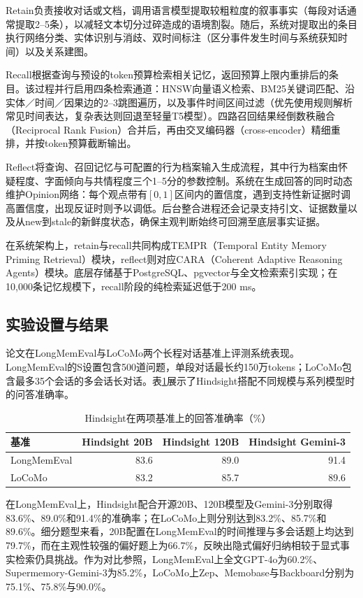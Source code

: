 Retain负责接收对话或文档，调用语言模型提取较粗粒度的叙事事实（每段对话通常提取2--5条），以减轻文本切分过碎造成的语境割裂。随后，系统对提取出的条目执行网络分类、实体识别与消歧、双时间标注（区分事件发生时间与系统获知时间）以及关系建图。

Recall根据查询与预设的token预算检索相关记忆，返回预算上限内重排后的条目。该过程并行启用四条检索通道：HNSW向量语义检索、BM25关键词匹配、沿实体／时间／因果边的2--3跳图遍历，以及事件时间区间过滤（优先使用规则解析常见时间表达，复杂表达则回退至轻量T5模型）。四路召回结果经倒数秩融合（Reciprocal Rank Fusion）合并后，再由交叉编码器（cross-encoder）精细重排，并按token预算截断输出。

Reflect将查询、召回记忆与可配置的行为档案输入生成流程，其中行为档案由怀疑程度、字面倾向与共情程度三个1--5分的参数控制。系统在生成回答的同时动态维护Opinion网络：每个观点带有$[0,1]$区间内的置信度，遇到支持性新证据时调高置信度，出现反证时则予以调低。后台整合进程还会记录支持引文、证据数量以及从new到stale的新鲜度状态，确保主观判断始终可回溯至底层事实证据。

在系统架构上，retain与recall共同构成TEMPR（Temporal Entity Memory Priming Retrieval）模块，reflect则对应CARA（Coherent Adaptive Reasoning Agents）模块。底层存储基于PostgreSQL、pgvector与全文检索索引实现；在10,000条记忆规模下，recall阶段的纯检索延迟低于200 ms。

\subsection{实验设置与结果}

论文在LongMemEval与LoCoMo两个长程对话基准上评测系统表现。LongMemEval的S设置包含500道问题，单段对话最长约150万tokens；LoCoMo包含最多35个会话的多会话长对话。表\ref{tab:hindsight-results}展示了Hindsight搭配不同规模与系列模型时的问答准确率。

\begin{table}[!htbp]
\centering
\caption{Hindsight在两项基准上的回答准确率（\%）}
\label{tab:hindsight-results}
\begin{tabular}{lrrr}
\toprule
基准 & Hindsight 20B & Hindsight 120B & Hindsight Gemini-3 \\
\midrule
LongMemEval & 83.6 & 89.0 & 91.4 \\
LoCoMo & 83.2 & 85.7 & 89.6 \\
\bottomrule
\end{tabular}
\end{table}

在LongMemEval上，Hindsight配合开源20B、120B模型及Gemini-3分别取得83.6\%、89.0\%和91.4\%的准确率；在LoCoMo上则分别达到83.2\%、85.7\%和89.6\%。细分题型来看，20B配置在LongMemEval的时间推理与多会话题上均达到79.7\%，而在主观性较强的偏好题上为66.7\%，反映出隐式偏好归纳相较于显式事实检索仍具挑战。作为对比参照，LongMemEval上全文GPT-4o为60.2\%、Supermemory-Gemini-3为85.2\%，LoCoMo上Zep、Memobase与Backboard分别为75.1\%、75.8\%与90.0\%。

